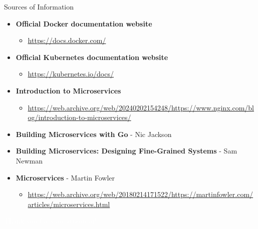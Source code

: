 \documentclass{beamer}
\begin{document}
\begin{frame}{Sources of Information}
    \begin{itemize}
        \item \textbf{Official Docker documentation website}
        \begin{itemize}
            \item \url{https://docs.docker.com/}
        \end{itemize}

        \item \textbf{Official Kubernetes documentation website}
        \begin{itemize}
            \item \url{https://kubernetes.io/docs/}
        \end{itemize}

        \item \textbf{Introduction to Microservices}
        \begin{itemize}
            \item \url{https://web.archive.org/web/20240202154248/https://www.nginx.com/blog/introduction-to-microservices/}
        \end{itemize}

        \item \textbf{Building Microservices with Go} - Nic Jackson

		\item \textbf{Building Microservices: Designing Fine-Grained Systems} - Sam Newman

        \item \textbf{Microservices} - Martin Fowler
        \begin{itemize}
            \item \url{https://web.archive.org/web/20180214171522/https://martinfowler.com/articles/microservices.html}
        \end{itemize}
    \end{itemize}
\end{frame}

\begin{frame}{}
	\begin{center}
		\Huge{\textcolor{white}{Thank you for your attention!}}
	\end{center}
\end{frame}

\end{document}
